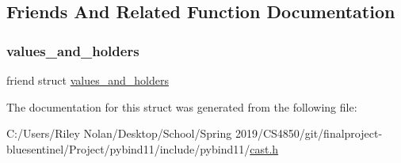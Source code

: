 \subsection{Friends And Related Function Documentation}
\mbox{\label{structvalues__and__holders_1_1iterator_a69240ad74e4283727c7dcb5c6fea589e}} 
\subsubsection{\texorpdfstring{values\_and\_holders}{values\_and\_holders}}
{\footnotesize\ttfamily friend struct \mbox{\hyperlink{structvalues__and__holders}{values\+\_\+and\+\_\+holders}}\hspace{0.3cm}{\ttfamily [friend]}}



The documentation for this struct was generated from the following file\+:\begin{DoxyCompactItemize}
\item 
C\+:/\+Users/\+Riley Nolan/\+Desktop/\+School/\+Spring 2019/\+C\+S4850/git/finalproject-\/bluesentinel/\+Project/pybind11/include/pybind11/\mbox{\hyperlink{cast_8h}{cast.\+h}}\end{DoxyCompactItemize}

